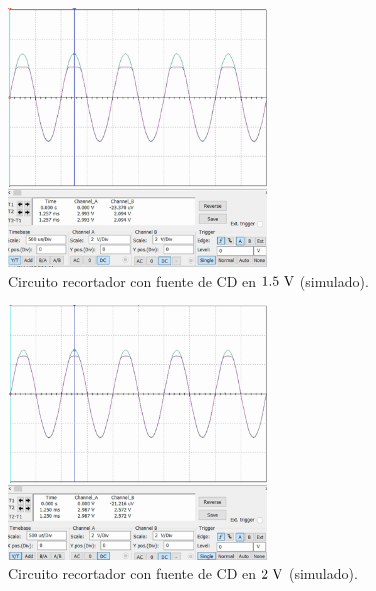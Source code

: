 \documentclass[journal]{IEEEtran}
\begin{document}
\begin{figure}[H]
        \centering
        \includegraphics[width=2.7in]{SignalSimulated_08.png}
        \caption{Circuito recortador con fuente de CD en $1.5~\textnormal{V}$ (simulado).}
        \label{fig:SignalSimulated_08}
\end{figure}
\begin{figure}[H]
        \centering
        \includegraphics[width=2.7in]{SignalSimulated_09.png}
        \caption{Circuito recortador con fuente de CD en $2~\textnormal{V}$ (simulado).}
        \label{fig:SignalSimulated_09}
\end{figure}
\end{document}
